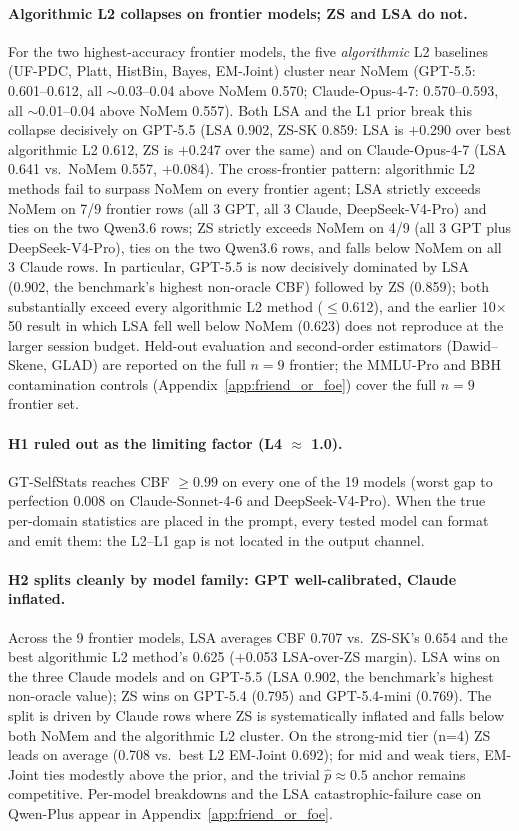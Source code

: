 \documentclass[11pt]{article}
\begin{document}
\paragraph{Algorithmic L2 collapses on frontier models; ZS and LSA do not.} For the two highest-accuracy frontier models, the five \emph{algorithmic} L2 baselines (UF-PDC, Platt, HistBin, Bayes, EM-Joint) cluster near NoMem (GPT-5.5: 0.601--0.612, all $\sim$0.03--0.04 above NoMem 0.570; Claude-Opus-4-7: 0.570--0.593, all $\sim$0.01--0.04 above NoMem 0.557). Both LSA and the L1 prior break this collapse decisively on GPT-5.5 (LSA 0.902, ZS-SK 0.859: LSA is $+$0.290 over best algorithmic L2 0.612, ZS is $+$0.247 over the same) and on Claude-Opus-4-7 (LSA 0.641 vs.\ NoMem 0.557, $+$0.084). The cross-frontier pattern: algorithmic L2 methods fail to surpass NoMem on every frontier agent; LSA strictly exceeds NoMem on 7/9 frontier rows (all 3 GPT, all 3 Claude, DeepSeek-V4-Pro) and ties on the two Qwen3.6 rows; ZS strictly exceeds NoMem on 4/9 (all 3 GPT plus DeepSeek-V4-Pro), ties on the two Qwen3.6 rows, and falls below NoMem on all 3 Claude rows. In particular, GPT-5.5 is now decisively dominated by LSA (0.902, the benchmark's highest non-oracle CBF) followed by ZS (0.859); both substantially exceed every algorithmic L2 method ($\le$0.612), and the earlier 10$\times$50 result in which LSA fell well below NoMem (0.623) does not reproduce at the larger session budget. Held-out evaluation and second-order estimators (Dawid--Skene, GLAD) are reported on the full $n{=}9$ frontier; the MMLU-Pro and BBH contamination controls (Appendix~\ref{app:friend_or_foe}) cover the full $n{=}9$ frontier set.

\paragraph{H1 ruled out as the limiting factor (L4 $\approx$ 1.0).}
GT-SelfStats reaches CBF $\geq 0.99$ on every one of the 19 models (worst gap to perfection 0.008 on Claude-Sonnet-4-6 and DeepSeek-V4-Pro). When the true per-domain statistics are placed in the prompt, every tested model can format and emit them: the L2--L1 gap is not located in the output channel.

\paragraph{H2 splits cleanly by model family: GPT well-calibrated, Claude inflated.} Across the 9 frontier models, LSA averages CBF 0.707 vs.\ ZS-SK's 0.654 and the best algorithmic L2 method's 0.625 ($+$0.053 LSA-over-ZS margin). LSA wins on the three Claude models and on GPT-5.5 (LSA 0.902, the benchmark's highest non-oracle value); ZS wins on GPT-5.4 (0.795) and GPT-5.4-mini (0.769). The split is driven by Claude rows where ZS is systematically inflated and falls below both NoMem and the algorithmic L2 cluster. On the strong-mid tier (n=4) ZS leads on average (0.708 vs.\ best L2 EM-Joint 0.692); for mid and weak tiers, EM-Joint ties modestly above the prior, and the trivial $\hat{p}\!\approx\!0.5$ anchor remains competitive. Per-model breakdowns and the LSA catastrophic-failure case on Qwen-Plus appear in Appendix~\ref{app:friend_or_foe}.
\end{document}
